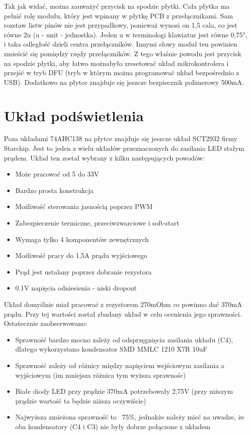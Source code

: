 \documentclass{article}
\begin{document}
    Tak jak widać, można zauważyć przycisk na spodzie płytki. Cała płytka ma pełnić rolę modułu, który jest wpinany w płytkę PCB
    z przełącznikami. Sam rozstaw listw pinów nie jest przypadkowy, ponieważ wynosi on 1,5 cala, co jest równe 2u (u - unit - jednostka).
    Jeden u w terminologi klawiatur jest równe 0,75", i taka odległość dzieli centra przełączników. Innymi słowy moduł ten powinien 
    zmieścić się pomiędzy rzędy przełączników. Z tego właśnie powodu jest przycisk na spodzie płytki, aby łatwo możnabyło zresetować
    układ mikrokontrolera i przejść w tryb DFU (tryb w którym można programować układ bezpośrednio z USB). Dodatkowo na płytce znajduje się
    jeszcze bezpiecznik polimerowy 500mA.
    \section{Układ podświetlenia}
    Poza układami 74AHC138 na płytce znajduje się jeszcze układ SCT2932 firmy Starchip. Jest to jeden z wielu układów przeznaczonych do zasilania
    LED stałym prądem. Układ ten został wybrany z kilku następujących powodów:
    \begin{itemize}
        \item Może pracować od 5 do 33V
        \item Bardzo prosta konstrukcja
        \item Możliwość sterowania jasnością poprzez PWM
        \item Zabezpieczenie termiczne, przeciwzwarciowe i soft-start
        \item Wymaga tylko 4 komponentów zewnętrznych
        \item Możliwość pracy do 1,5A prądu wyjściowego
        \item Prąd jest ustalany poprzez dobranie rezystora
        \item 0.1V napięcia odniesienia - niski dropout
    \end{itemize}
    Układ domyślnie miał pracować z rezystorem 270mOhm co powinno dać 370mA prądu. Przy tej wartości został zbadany układ w celu
    ocenienia jego sprawności. Ostatecznie zaobserwowano:
    \begin{itemize}
        \item Sprawność bardzo mocno zależy od odsprzęgnięcia zasilania układu (C4), dlatego wykorzystano kondensator SMD MMLC 1210 X7R 10uF
        \item Sprawność zależy od różnicy między napięciem wejściowym zasilania a wyjściowym (im mniejsza różnica tym wyższa sprawnośc)
        \item Białe diody LED przy prądzie 370mA potrzebowały 2,75V (przy niższym prądzie wartość ta będzie niższa oczywiście)
        \item Najwyższa zmieżona sprawność to ~75\%, jednakże należy mieć na uwadze, że oba kondensatory (C4 i C3) nie były dobrze połączone z układem
    \end{itemize}
\end{document}
